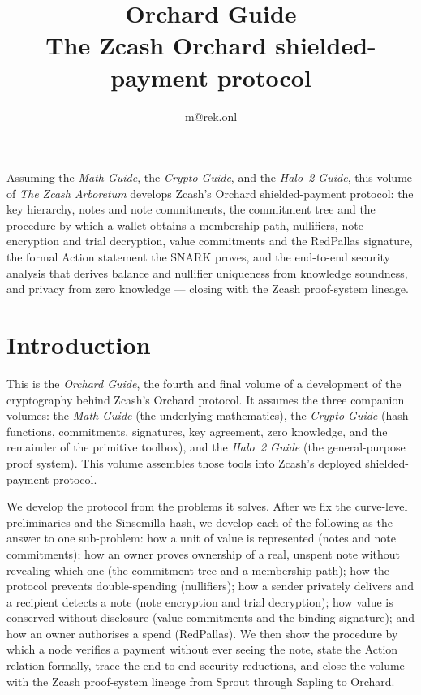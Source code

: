 \documentclass[11pt,a4paper]{article}
\title{\textbf{\Huge Orchard Guide}\\[6pt]\large The Zcash Orchard shielded-payment protocol}
\author{m@rek.onl}
\date{}
\theoremstyle{definition}
\renewenvironment{abstract}{%
  \small\begin{center}{\bfseries\abstractname}\end{center}\medskip\noindent\ignorespaces
}{\par\medskip}
\begin{document}
\maketitle
\thispagestyle{empty}
\begin{abstract}
Assuming the \emph{Math Guide}, the \emph{Crypto Guide}, and the \emph{Halo~2 Guide}, this volume of \emph{The Zcash Arboretum} develops Zcash's Orchard shielded-payment protocol: the key hierarchy, notes and note commitments, the commitment tree and the procedure by which a wallet obtains a membership path, nullifiers, note encryption and trial decryption, value commitments and the RedPallas signature, the formal Action statement the SNARK proves, and the end-to-end security analysis that derives balance and nullifier uniqueness from knowledge soundness, and privacy from zero knowledge --- closing with the Zcash proof-system lineage.
\end{abstract}
\clearpage
\tableofcontents
\clearpage

\section{Introduction}\label{sec:intro}
This is the \emph{Orchard Guide}, the fourth and final volume of a development of the cryptography
behind Zcash's Orchard protocol. It assumes the three companion volumes: the \emph{Math Guide}
(the underlying mathematics), the \emph{Crypto Guide} (hash functions, commitments, signatures,
key agreement, zero knowledge, and the remainder of the primitive toolbox), and the \emph{Halo~2 Guide}
(the general-purpose proof system). This volume assembles those tools into Zcash's deployed
shielded-payment protocol.

We develop the protocol from the problems it solves. After
we fix the curve-level preliminaries and the Sinsemilla hash, we develop each of the following
as the answer to one sub-problem: how a unit of value is represented (notes and note commitments); how
an owner proves ownership of a real, unspent note without revealing which one (the commitment tree and a
membership path); how the protocol prevents double-spending (nullifiers); how
a sender privately delivers and a recipient detects a note (note encryption and trial decryption); how value
is conserved without disclosure (value commitments and the binding signature); and how an owner authorises a
spend (RedPallas). We then
show the procedure by which a node verifies a payment without ever seeing the
note, state the Action relation formally, trace the end-to-end security reductions, and close the volume with the Zcash
proof-system lineage from Sprout through Sapling to Orchard.
\end{document}
